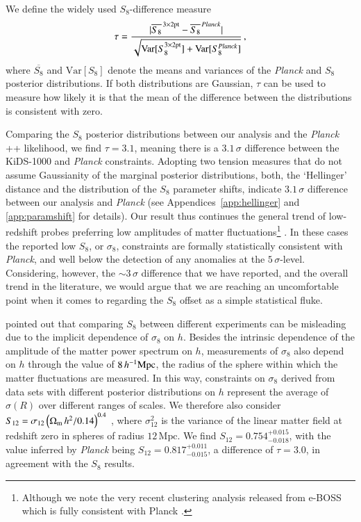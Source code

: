 We define the widely used $S_8$-difference measure
\begin{equation}
\label{eq: std_tension}
\tau = \frac{|\overline{S_{8}}^{\,\rm 3\times2pt}-\overline{S_{8}}^{\,\it Planck}|}{\sqrt{\mathrm{Var}[S_{8}^{\rm 3\times2pt}] + \mathrm{Var}[S_{8}^{\it Planck}]}} \,,
\end{equation}
where $\overline{S_{8}}$ and $\mathrm{Var}[S_{8}] $ denote the means and variances of the {\it Planck} and \tttp $S_8$ posterior distributions.  If both distributions are Gaussian, $\tau$ can be used to measure how likely it is that the mean of the difference between the distributions is consistent with zero.

Comparing the $S_{8}$ posterior distributions between our \tttp analysis and the {\it Planck} ++ likelihood, we find $\tau=3.1$, meaning there is a $3.1\,\sigma$ difference between the KiDS-1000 and {\it Planck} constraints. 
%  
Adopting two tension measures that do not assume Gaussianity of the marginal posterior distributions, both, the `Hellinger' distance and the distribution of the $S_{8}$ parameter shifts, indicate $3.1\,\sigma$ difference between our \tttp analysis and {\it Planck} (see Appendices~\ref{app:hellinger} and \ref{app:paramshift} for details).  
%
Our result thus continues the general trend of low-redshift probes preferring low amplitudes of matter fluctuations\footnote{Although we note the very recent clustering analysis released from e-BOSS which is fully consistent with Planck \citep{eBOSS/etal:2020}.} \citep{heymans/etal:2013, alam/etal:2017, abbott/etal:2018, hikage/etal:2019, bocquet/etal:2019, palanque-delabrouille/etal:2020, wright/etal:2020b,DESclusters/etal:2020}. 
In these cases the reported low $S_8$, or $\sigma_8$, constraints are formally statistically consistent with {\it Planck}, and well below the detection of any anomalies at the $5\,\sigma$-level. 
Considering, however, the $\sim\! 3\,\sigma$ difference that we have reported, and the overall trend in the literature, we would argue that we are reaching an uncomfortable point when it comes to regarding the $S_8$ offset as a simple statistical fluke.

\citet{Sanchez2020} pointed out that comparing $S_{8}$ between different experiments can be misleading due to the implicit dependence of $\sigma_{8}$ on $h$. 
Besides the intrinsic dependence of the amplitude of the matter power spectrum on $h$, measurements of $\sigma_{8}$ also depend on $h$ through the value of $8\,h^{-1}{\rm Mpc}$, the radius of the sphere within which the matter fluctuations are measured. 
In this way, constraints on $\sigma_8$ derived from data sets with different posterior distributions on $h$ represent the average of $\sigma(R)$ over different ranges of scales. 
%
We therefore also consider $S_{12} = \sigma_{12}\left(\Omega_{\rm m}\,h^2/0.14\right)^{0.4}$ \citep{Sanchez2020}, where $\sigma_{12}^{2}$ is the variance of the linear matter field at redshift zero in spheres of radius $12\,\mathrm{Mpc}$.
We find $S_{12} = 0.754^{+0.015}_{-0.018}$, with the value inferred by {\it Planck} being $S_{12} = 0.817_{-0.015}^{+0.011}
$, a difference of $\tau=3.0$, in agreement with the $S_8$ results. 

